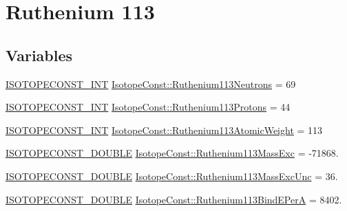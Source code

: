 \hypertarget{group___isotope_const-_ruthenium-_ru113}{}\section{Ruthenium 113}
\label{group___isotope_const-_ruthenium-_ru113}
\subsection*{Variables}
\begin{DoxyCompactItemize}
\item 
\mbox{\hyperlink{group___isotope_const-_macros_ga5f18360b3e99483a35c32d789e62621c}{I\+S\+O\+T\+O\+P\+E\+C\+O\+N\+S\+T\+\_\+\+I\+NT}} \mbox{\hyperlink{group___isotope_const-_ruthenium-_ru113_ga9d2653c7df7a1943b6a2bfdf19edd8d3}{Isotope\+Const\+::\+Ruthenium113\+Neutrons}} = 69
\item 
\mbox{\hyperlink{group___isotope_const-_macros_ga5f18360b3e99483a35c32d789e62621c}{I\+S\+O\+T\+O\+P\+E\+C\+O\+N\+S\+T\+\_\+\+I\+NT}} \mbox{\hyperlink{group___isotope_const-_ruthenium-_ru113_ga527f31dfdd26c2b9fd127fbf4ed5d997}{Isotope\+Const\+::\+Ruthenium113\+Protons}} = 44
\item 
\mbox{\hyperlink{group___isotope_const-_macros_ga5f18360b3e99483a35c32d789e62621c}{I\+S\+O\+T\+O\+P\+E\+C\+O\+N\+S\+T\+\_\+\+I\+NT}} \mbox{\hyperlink{group___isotope_const-_ruthenium-_ru113_gaeada975633aa640a6a4846e885d1bb85}{Isotope\+Const\+::\+Ruthenium113\+Atomic\+Weight}} = 113
\item 
\mbox{\hyperlink{group___isotope_const-_macros_ga8f45a7272ce02c0b4c65c44636ed719a}{I\+S\+O\+T\+O\+P\+E\+C\+O\+N\+S\+T\+\_\+\+D\+O\+U\+B\+LE}} \mbox{\hyperlink{group___isotope_const-_ruthenium-_ru113_ga0fed438294290ee64b7eeeaf8a6a7830}{Isotope\+Const\+::\+Ruthenium113\+Mass\+Exc}} = -\/71868.
\item 
\mbox{\hyperlink{group___isotope_const-_macros_ga8f45a7272ce02c0b4c65c44636ed719a}{I\+S\+O\+T\+O\+P\+E\+C\+O\+N\+S\+T\+\_\+\+D\+O\+U\+B\+LE}} \mbox{\hyperlink{group___isotope_const-_ruthenium-_ru113_gaf9054a3c204842934109398df366b270}{Isotope\+Const\+::\+Ruthenium113\+Mass\+Exc\+Unc}} = 36.
\item 
\mbox{\hyperlink{group___isotope_const-_macros_ga8f45a7272ce02c0b4c65c44636ed719a}{I\+S\+O\+T\+O\+P\+E\+C\+O\+N\+S\+T\+\_\+\+D\+O\+U\+B\+LE}} \mbox{\hyperlink{group___isotope_const-_ruthenium-_ru113_gaa74c7d6d63c6d2a0a04fe708b6ac28bd}{Isotope\+Const\+::\+Ruthenium113\+Bind\+E\+PerA}} = 8402.
\item 

\end{DoxyCompactItemize}
